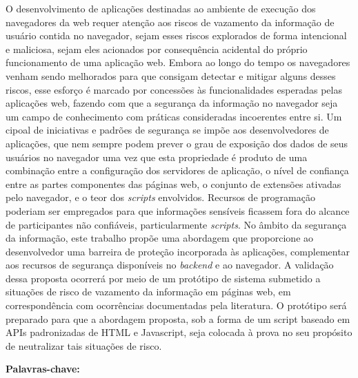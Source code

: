 \newpage
\begin{resumo}
\normalsize

O desenvolvimento de aplicações destinadas ao ambiente de execução dos navegadores da web requer atenção aos riscos de vazamento da informação de usuário contida no navegador, sejam esses riscos explorados de forma intencional e maliciosa, sejam eles acionados por consequência acidental do próprio funcionamento de uma aplicação web. Embora ao longo do tempo os navegadores venham sendo melhorados para que consigam detectar e mitigar alguns desses riscos, esse esforço é marcado por concessões às funcionalidades esperadas pelas aplicações web, fazendo com que a segurança da informação no navegador seja um campo de conhecimento com práticas consideradas incoerentes entre si. Um cipoal de iniciativas e padrões de segurança se impõe aos desenvolvedores de aplicações, que nem sempre podem prever o grau de exposição dos dados de seus usuários no navegador uma vez que esta propriedade é produto de uma combinação entre a configuração dos servidores de aplicação, o nível de confiança entre as partes componentes das páginas web, o conjunto de extensões ativadas pelo navegador, e o teor dos \textit{scripts} envolvidos.
Recursos de programação poderiam ser empregados para que informações sensíveis ficassem fora do alcance de participantes não confiáveis, particularmente \textit{scripts}.
No âmbito da segurança da informação, este trabalho propõe uma abordagem que proporcione ao desenvolvedor uma barreira de proteção incorporada às aplicações, complementar aos recursos de segurança disponíveis no \textit{backend} e ao navegador.
A validação dessa proposta ocorrerá por meio de um protótipo de sistema submetido a situações de risco de vazamento da informação em páginas web, em correspondência com ocorrências documentadas pela literatura. O protótipo será preparado para que a abordagem proposta, sob a forma de um script baseado em APIs padronizadas de HTML e Javascript, seja colocada à prova no seu propósito de neutralizar tais situações de risco.


\vspace{\onelineskip}

\noindent
\textbf{Palavras-chave:} \imprimirpalavraschave
\end{resumo}

